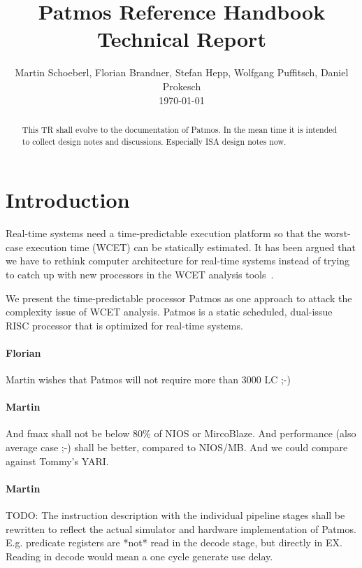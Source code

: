 \documentclass{IEEEtran}
\newcommand{\comment}[3]{\paragraph*{\textbf{#1}}{\color{#3}#2}}
\newcommand{\martin}[1]{\comment{Martin}{#1}{Blue}}
\newcommand{\fb}[1]{\comment{Florian}{#1}{Emerald}}
\begin{document}
\title{Patmos Reference Handbook\\{\huge Technical Report}}

\author{Martin Schoeberl, Florian Brandner, Stefan Hepp, Wolfgang Puffitsch, Daniel Prokesch\\
\today}


\maketitle

\begin{abstract}
This TR shall evolve to the documentation of Patmos. In the mean time it is intended to collect design notes and discussions.
Especially ISA design notes now.

\end{abstract}



\section{Introduction}

Real-time systems need a time-predictable execution platform so that the worst-case execution time (WCET) can be statically estimated. It has been argued that we have to rethink computer architecture for real-time systems instead of trying to catch up with new processors in the WCET analysis tools~\cite{tpca:jes, pret:dac2007}.

We present the time-predictable processor Patmos as one approach to attack the complexity issue of WCET analysis. Patmos is a static scheduled, dual-issue RISC processor that is optimized for real-time systems.





\fb{Martin wishes that Patmos will not require more than 3000 LC ;-)}
\martin{And fmax shall not be below 80\% of NIOS or MircoBlaze.
And performance (also average case ;-) shall be better, compared to NIOS/MB.
And we could compare against Tommy's YARI.}

\martin{TODO: The instruction description with the individual pipeline stages shall be
rewritten to reflect the actual simulator and hardware implementation of Patmos.
E.g. predicate registers are *not* read in the decode stage, but directly in EX.
Reading in decode would mean a one cycle generate use delay.}
\end{document}
